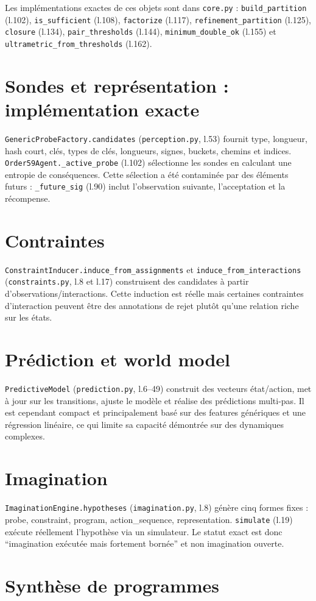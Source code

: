 \documentclass[11pt,a4paper]{article}
\begin{document}
Les implémentations exactes de ces objets sont dans \texttt{core.py} : \texttt{build\_partition} (l.102), \texttt{is\_sufficient} (l.108), \texttt{factorize} (l.117), \texttt{refinement\_partition} (l.125), \texttt{closure} (l.134), \texttt{pair\_thresholds} (l.144), \texttt{minimum\_double\_ok} (l.155) et \texttt{ultrametric\_from\_thresholds} (l.162).\section{Sondes et représentation : implémentation exacte}
\texttt{GenericProbeFactory.candidates} (\texttt{perception.py}, l.53) fournit type, longueur, hash court, clés, types de clés, longueurs, signes, buckets, chemins et indices. \texttt{Order59Agent.\_active\_probe} (l.102) sélectionne les sondes en calculant une entropie de conséquences. Cette sélection a été contaminée par des éléments futurs : \texttt{\_future\_sig} (l.90) inclut l'observation suivante, l'acceptation et la récompense.\section{Contraintes}
\texttt{ConstraintInducer.induce\_from\_assignments} et \texttt{induce\_from\_interactions} (\texttt{constraints.py}, l.8 et l.17) construisent des candidates à partir d'observations/interactions. Cette induction est réelle mais certaines contraintes d'interaction peuvent être des annotations de rejet plutôt qu'une relation riche sur les états.\section{Prédiction et world model}
\texttt{PredictiveModel} (\texttt{prediction.py}, l.6--49) construit des vecteurs état/action, met à jour sur les transitions, ajuste le modèle et réalise des prédictions multi-pas. Il est cependant compact et principalement basé sur des features génériques et une régression linéaire, ce qui limite sa capacité démontrée sur des dynamiques complexes.\section{Imagination}
\texttt{ImaginationEngine.hypotheses} (\texttt{imagination.py}, l.8) génère cinq formes fixes : probe, constraint, program, action\_sequence, representation. \texttt{simulate} (l.19) exécute réellement l'hypothèse via un simulateur. Le statut exact est donc ``imagination exécutée mais fortement bornée'' et non imagination ouverte.\section{Synthèse de programmes}
\end{document}
